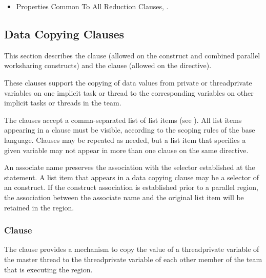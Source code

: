 \crossreferences
\begin{itemize}
\item Properties Common To All Reduction Clauses,
.
\end{itemize}



\subsection{Data Copying Clauses}
\label{subsec:Data Copying Clauses}
This section describes the  clause (allowed on the  
construct and combined parallel worksharing constructs) and the  
clause (allowed on the  directive).

These clauses support the copying of data values from private or threadprivate 
variables on one implicit task or thread to the corresponding variables on other 
implicit tasks or threads in the team.

The clauses accept a comma-separated list of list items (see 
). All list items appearing in a clause must be 
visible, according to the scoping rules of the base language. Clauses may be 
repeated as needed, but a list item that specifies a given variable may not 
appear in more than one clause on the same directive.

\begin{fortranspecific}
An associate name preserves the association with the selector established at 
the  statement. A list item that appears in a data copying 
clause may be a selector of an  construct. If the construct 
association is established prior to a parallel region, the association between 
the associate name and the original list item will be retained in the region.
\end{fortranspecific}



\subsubsection{ Clause}
\label{subsubsec:copyin clause}
\summary
The  clause provides a mechanism to copy the value of a threadprivate 
variable of the master thread to the threadprivate variable of each other member of 
the team that is executing the  region.

